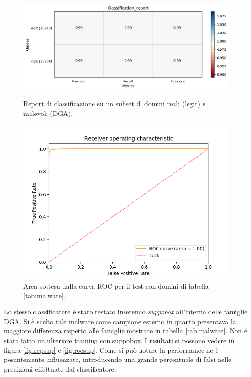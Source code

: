 \begin{figure}[!ht]
    \centering
    \includegraphics[width=\columnwidth]{figures/rndf_tra_nosup_nosup/class_rep.png}
    \caption{Report di classificazione su un subset di domini reali (legit) e malevoli (DGA).\label{fig:repdga}}

    \centering
    \includegraphics[width=\columnwidth]{figures/rndf_tra_nosup_nosup/roc_plot.png}
    \caption{Area sottesa dalla curva ROC per il test con domini di tabella \ref{tab:malware}.\label{fig:rocdga}}
\end{figure}

Lo stesso classificatore è stato testato inserendo \textit{suppobox} all'interno delle famiglie DGA. Si è scelto tale malware come campione esterno in quanto presentava la maggiore differenza rispetto alle famiglie mostrate in tabella \ref{tab:malware}. Non è stato fatto un ulteriore training con suppobox. I risultati si possono vedere in figura \ref{fig:repsup} e \ref{fig:rocsup}. Come si può notare la performance ne è pesantemente influenzata, introducendo una grande percentuale di falsi nelle predizioni effettuate dal classificatore.

